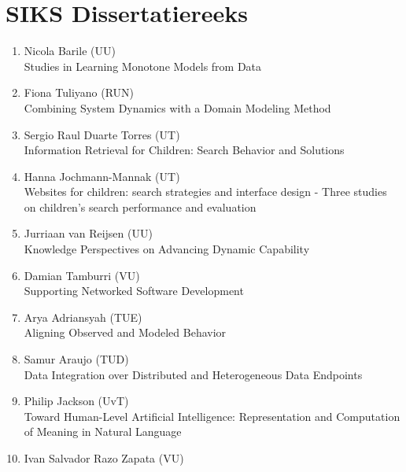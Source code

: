 \chapter*{SIKS Dissertatiereeks}
\pagestyle{siks}
\vspace{-1.3cm}
\begin{multicols}{2}
\begin{scriptsize}

\begin{enumerate}[label=\textbf{2014-\arabic*},leftmargin=0cm,itemindent=1.15cm,labelwidth=\itemindent,labelsep=0cm,align=left,noitemsep]
\item Nicola Barile (UU) \\
	Studies in Learning Monotone Models from Data
\item Fiona Tuliyano (RUN) \\
	Combining System Dynamics with a Domain Modeling Method
\item Sergio Raul Duarte Torres (UT) \\
	Information Retrieval for Children: Search Behavior and Solutions
\item Hanna Jochmann-Mannak (UT)\\
	Websites for children: search strategies and interface design - Three studies on children's search performance and evaluation
\item Jurriaan van Reijsen (UU) \\
	Knowledge Perspectives on Advancing Dynamic Capability
\item Damian Tamburri (VU)\\
	Supporting Networked Software Development
\item Arya Adriansyah (TUE) \\
	Aligning Observed and Modeled Behavior
\item Samur Araujo (TUD)\\
	Data Integration over Distributed and Heterogeneous Data Endpoints
\item Philip Jackson (UvT) \\
	Toward Human-Level Artificial Intelligence: Re\-pre\-sen\-ta\-tion and Computation of Meaning in Natural Language
\item Ivan Salvador Razo Zapata (VU)\\

\end{enumerate}
\end{scriptsize}
\end{multicols}
